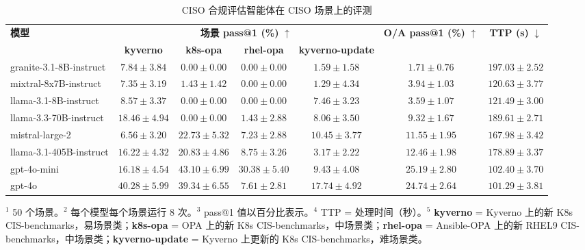\documentclass[10pt,UTF8,fontset=fandol]{ctexart}
\begin{document}
\begin{table}[H]
\centering
\caption{CISO 合规评估智能体在 CISO 场景上的评测}
\label{tab:itb-ciso}
\begin{adjustbox}{max width=\linewidth}
\begin{tabular}{lcccc cc}
\toprule
\multirow{2}{*}{\textbf{模型}} & \multicolumn{4}{c}{\textbf{场景 pass@1 (\%)} $\uparrow$} & \multirow{2}{*}{\textbf{O/A pass@1 (\%)} $\uparrow$} & \multirow{2}{*}{\textbf{TTP (s)} $\downarrow$} \\
\cmidrule(lr){2-5}
 & \textbf{kyverno} & \textbf{k8s-opa} & \textbf{rhel-opa} & \textbf{kyverno-update} & & \\
\midrule
granite-3.1-8B-instruct & $7.84 \pm 3.84$ & $0.00 \pm 0.00$ & $0.00 \pm 0.00$ & $1.59 \pm 1.58$ & $1.71 \pm 0.76$ & $197.03 \pm 2.52$ \\
mixtral-8x7B-instruct & $7.35 \pm 3.19$ & $1.43 \pm 1.42$ & $0.00 \pm 0.00$ & $1.29 \pm 4.34$ & $3.94 \pm 1.03$ & $120.63 \pm 3.77$ \\
llama-3.1-8B-instruct & $8.57 \pm 3.37$ & $0.00 \pm 0.00$ & $0.00 \pm 0.00$ & $7.46 \pm 3.23$ & $3.59 \pm 1.07$ & $121.49 \pm 3.00$ \\
llama-3.3-70B-instruct & $18.46 \pm 4.94$ & $0.00 \pm 0.00$ & $1.43 \pm 2.88$ & $8.06 \pm 3.50$ & $9.32 \pm 1.67$ & $189.61 \pm 2.71$ \\
mistral-large-2 & $6.56 \pm 3.20$ & $22.73 \pm 5.32$ & $7.23 \pm 2.88$ & $10.45 \pm 3.77$ & $11.55 \pm 1.95$ & $167.98 \pm 3.42$ \\
llama-3.1-405B-instruct & $16.22 \pm 4.32$ & $20.83 \pm 4.86$ & $8.75 \pm 3.26$ & $3.17 \pm 2.22$ & $12.46 \pm 1.98$ & $178.89 \pm 3.37$ \\
gpt-4o-mini & $16.18 \pm 4.54$ & $\mathbf{43.10 \pm 6.99}$ & $\mathbf{30.38 \pm 5.40}$ & $9.43 \pm 4.08$ & $\mathbf{25.19 \pm 2.80}$ & $102.40 \pm 3.70$ \\
gpt-4o & $\mathbf{40.28 \pm 5.99}$ & $39.34 \pm 6.55$ & $7.61 \pm 2.81$ & $\mathbf{17.74 \pm 4.92}$ & $24.74 \pm 2.64$ & $\mathbf{101.29 \pm 3.81}$ \\
\bottomrule
\end{tabular}
\end{adjustbox}

{\footnotesize
\noindent $^1$ 50 个场景。\quad $^2$ 每个模型每个场景运行 8 次。\quad $^3$ pass@1 值以百分比表示。\quad $^4$ TTP = 处理时间（秒）。\quad $^5$ \textbf{kyverno} = Kyverno 上的新 K8s CIS-benchmarks，易场景类；\textbf{k8s-opa} = OPA 上的新 K8s CIS-benchmarks，中场景类；\textbf{rhel-opa} = Ansible-OPA 上的新 RHEL9 CIS-benchmarks，中场景类；\textbf{kyverno-update} = Kyverno 上更新的 K8s CIS-benchmarks，难场景类。
\par}
\end{table}
\end{document}
